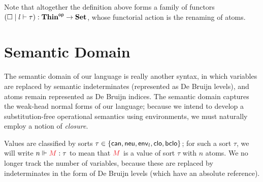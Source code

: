 \documentclass{article}
\DeclarePairedDelimiter\Parens{\lparen}{\rparen}
\DeclarePairedDelimiter\Angles{\langle}{\rangle}
\DeclarePairedDelimiter\Squares{[}{]}
\DeclarePairedDelimiter\Braces{\lbrace}{\rbrace}
\newcommand\FmtKwd[1]{\mathsf{#1}}
\newcommand\FmtThin[1]{{\color{ProcessBlue}#1}}
\newcommand\THIN{\mathbf{Thin}}
\newcommand\OpCat[1]{{#1}^{\mathsf{op}}}
\newcommand\SET{\mathbf{Set}}
\newcommand\Tm[3]{{#1}\mid{#2}\vdash{#3}}
\newcommand\FmtTm[1]{{\color{Violet}#1}}
\newcommand\FmtVal[1]{{\color{Red}{#1}}}
\begin{document}
Note that altogether the definition above forms a family of functors
$\Parens*{\Tm{\square}{l}{\tau}}:\OpCat{\THIN}\to\SET$, whose
functorial action is the renaming of atoms.

\section{Semantic Domain}

The semantic domain of our language is really another syntax, in which
variables are replaced by semantic indeterminates (represented as De
Bruijn levels), and atoms remain represented as De Bruijn indices. The
semantic domain captures the weak-head normal forms of our language;
because we intend to develop a substitution-free operational semantics
using environments, we must naturally employ a notion of
\emph{closure}.

\newcommand\SortCan{\FmtKwd{can}}
\newcommand\SortNeu{\FmtKwd{neu}}
\newcommand\SortClo{\FmtKwd{clo}}
\newcommand\SortBClo{\FmtKwd{bclo}}
\newcommand\SortEnv[1]{\FmtKwd{env}_{#1}}
\newcommand\IsVal[3]{{#1}\Vdash\FmtVal{#2}:{#3}}
\newcommand\Val[2]{{#1}\Vdash{#2}}

\newcommand\Clo[4]{
  \Squares*{
    \FmtThin{#1}%
    \mathbin{\color{gray}*}%
    \Angles*{
      \FmtTm{#4}
      \mathbin{\color{gray}\triangleleft}%
      \FmtThin{#2}
      \mathbin{\color{gray}*}%
      \FmtVal{#3}
    }
  }
}

\newcommand\BClo[4]{
  \Squares*{
    \FmtThin{#1}%
    \mathbin{\color{gray}*}%
    \Angles*{
      \FmtTm{#4}
      \mathbin{\color{gray}\triangleleft^+}%
      \FmtThin{#2}
      \mathbin{\color{gray}*}%
      \FmtVal{#3}
    }
  }
}


Values are classified by sorts
$\tau\in\Braces*{\SortCan,\SortNeu,\SortEnv{l},\SortClo,\SortBClo}$; for
such a sort $\tau$, we will write $\IsVal{n}{M}{\tau}$ to mean that
$\FmtVal{M}$ is a value of sort $\tau$ with $n$ atoms. We no longer
track the number of variables, because these are replaced by
indeterminates in the form of De Bruijn levels (which have an absolute
reference).
\end{document}
